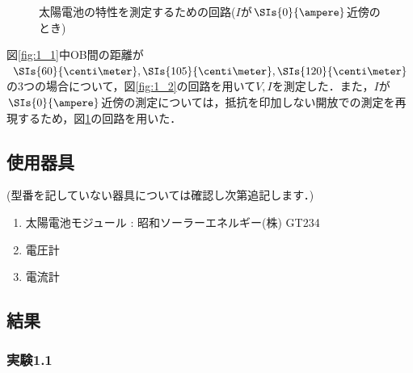 \documentclass[1_power_supply.tex]{subfiles}
\begin{document}
      \begin{figure}[htbp]
        \begin{center}
          \caption{太陽電池の特性を測定するための回路($I$が$\SIs{0}{\ampere}$近傍のとき)}\label{fig:1_3}
        \end{center}
      \end{figure}

      図\ref{fig:1_1}中OB間の距離が$\SIs{60}{\centi\meter},\SIs{105}{\centi\meter},\SIs{120}{\centi\meter}$の3つの場合について，図\ref{fig:1_2}の回路を用いて$V,I$を測定した．また，$I$が$\SIs{0}{\ampere}$近傍の測定については，抵抗を印加しない開放での測定を再現するため，図\ref{fig:1_3}の回路を用いた．

  \subsection{使用器具}
    (型番を記していない器具については確認し次第追記します．)
    \begin{enumerate}
      \item 太陽電池モジュール : 昭和ソーラーエネルギー(株) GT234
      \item 電圧計
      \item 電流計
    \end{enumerate}

  \subsection{結果}

    \subsubsection{実験1.1}
\end{document}
